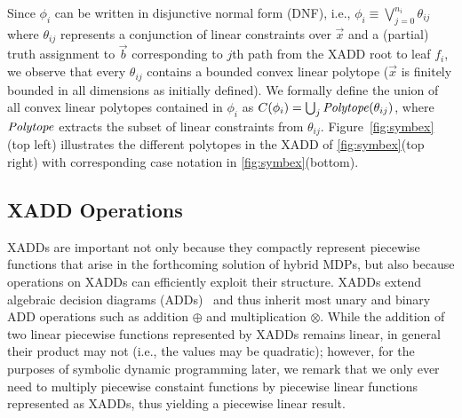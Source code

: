 %

%
Since $\phi_i$ can be written in disjunctive normal form (DNF), i.e.,
$\phi_i \equiv \bigvee_{j=0}^{n_i} \theta_{ij}$ where $\theta_{ij}$
represents a conjunction of linear constraints over $\vec{x}$ and a
(partial) truth assignment to $\vec{b}$ corresponding to $j$th path
from the XADD root to leaf $f_i$, we observe that every
$\theta_{ij}$ contains a bounded convex linear polytope ($\vec{x}$ is
finitely bounded in all dimensions as initially defined).  
We formally define the union of all convex linear polytopes contained in 
$\phi_i$ as
$C(\phi_i) = \bigcup_j \mathit{Polytope}(\theta_{ij})$, 
where $\mathit{Polytope}$ extracts the subset of linear constraints from
$\theta_{ij}$. Figure~\ref{fig:symbex}(top left) illustrates the different
polytopes in the XADD of \ref{fig:symbex}(top right) with
corresponding case notation in \ref{fig:symbex}(bottom).

\subsection{XADD Operations} 

XADDs are important not only because they compactly represent
piecewise functions that arise in the forthcoming solution of hybrid
MDPs, but also because operations on XADDs can efficiently exploit
their structure.  XADDs extend algebraic decision diagrams
(ADDs)~\cite{bahar93add} and thus inherit most unary and binary ADD
operations such as addition $\oplus$ and multiplication $\otimes$.
While the addition of two linear piecewise functions represented by
XADDs remains linear, in general their product may not (i.e., the values
may be quadratic); however, for the purposes of symbolic dynamic
programming later, we remark that we only ever need to multiply
piecewise constaint functions by piecewise linear functions
represented as XADDs, thus yielding a piecewise linear result.

